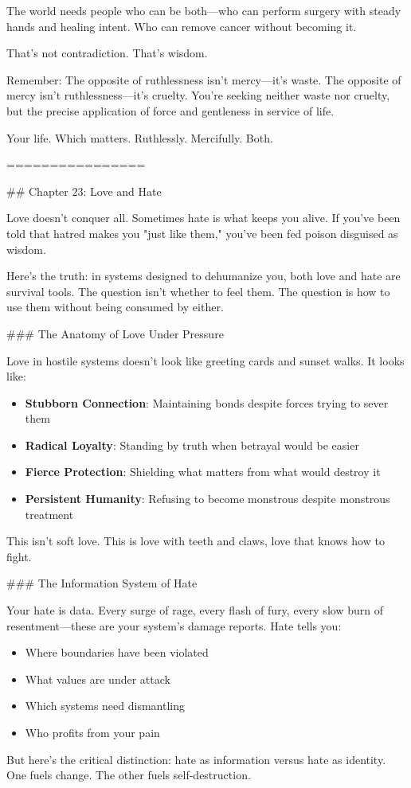 \documentclass[12pt]{book}
\begin{document}
The world needs people who can be both—who can perform surgery with steady hands and healing intent. Who can remove cancer without becoming it.

That's not contradiction. That's wisdom.

Remember: The opposite of ruthlessness isn't mercy—it's waste. The opposite of mercy isn't ruthlessness—it's cruelty. You're seeking neither waste nor cruelty, but the precise application of force and gentleness in service of life.

Your life. Which matters. Ruthlessly. Mercifully. Both.

================

\#\# Chapter 23: Love and Hate

Love doesn't conquer all. Sometimes hate is what keeps you alive. If you've been told that hatred makes you "just like them," you've been fed poison disguised as wisdom.

Here's the truth: in systems designed to dehumanize you, both love and hate are survival tools. The question isn't whether to feel them. The question is how to use them without being consumed by either.

\#\#\# The Anatomy of Love Under Pressure

Love in hostile systems doesn't look like greeting cards and sunset walks. It looks like:

\begin{itemize}
\item \textbf{Stubborn Connection}: Maintaining bonds despite forces trying to sever them
\item \textbf{Radical Loyalty}: Standing by truth when betrayal would be easier
\item \textbf{Fierce Protection}: Shielding what matters from what would destroy it
\item \textbf{Persistent Humanity}: Refusing to become monstrous despite monstrous treatment

\end{itemize}
This isn't soft love. This is love with teeth and claws, love that knows how to fight.

\#\#\# The Information System of Hate

Your hate is data. Every surge of rage, every flash of fury, every slow burn of resentment—these are your system's damage reports. Hate tells you:

\begin{itemize}
\item Where boundaries have been violated
\item What values are under attack
\item Which systems need dismantling
\item Who profits from your pain

\end{itemize}
But here's the critical distinction: hate as information versus hate as identity. One fuels change. The other fuels self-destruction.
\end{document}
